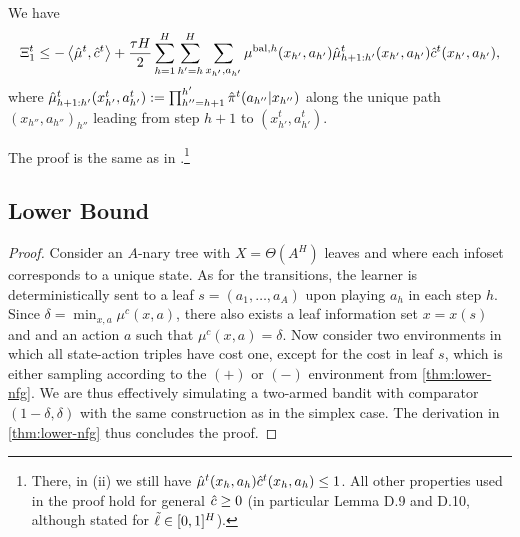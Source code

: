 \begin{lemma}\label{lem:log-to-linear}
    We have
    \begin{align*}
        \Xi^t_1 \leq -\left\langle \hat{\mu}^t, \hat{c}^t \right\rangle + \frac{\tau H}{2} \sum_{h=1}^{H} \sum_{h'=h}^H \sum_{x_{h'},a_{h'}} \mu^{\text{bal},h}(x_{h'},a_{h'}) \hat{\mu}^{t}_{h+1:h'}(x_{h'},a_{h'})\hat{c}^t(x_{h'},a_{h'}),
    \end{align*}
    where $\hat{\mu}^t_{h+1:h'}(x_{h'}^t,a_{h'}^t):=\prod_{h''=h+1}^{h'}\hat{\pi}^t(a_{h''}|x_{h''})$ along the unique path $(x_{h''},a_{h''})_{h''}$ leading from step $h+1$ to $(x_{h'}^t,a_{h'}^t)$.
\end{lemma}

\noindent The proof is the same as in \citet{bai2022near}.\footnote{There, in (ii) we still have $\hat{\mu}^t(x_h,a_h) \hat{c}^t(x_h,a_h) \leq 1$. All other properties used in the proof hold for general $\hat{c} \geq 0$ (in particular Lemma D.9 and D.10, although stated for $\tilde{\ell} \in [0,1]^H$).} 

\subsection{Lower Bound} \label{app:efg-lower}


\thmEfgLower*

\begin{proof}
    Consider an $A$-nary tree with $X=\Theta(A^H)$ leaves and where each infoset corresponds to a unique state. As for the transitions, the learner is deterministically sent to a leaf $s=(a_1,\dots,a_A)$ upon playing $a_h$ in each step $h$. Since $\delta=\min_{x,a}\mu^c(x,a)$, there also exists a leaf information set $x=x(s)$ and and an action $a$ such that $\mu^c(x,a)=\delta$. Now consider two environments in which all state-action triples have cost one, except for the cost in leaf $s$, which is either sampling according to the $(+)$ or $(-)$ environment from \cref{thm:lower-nfg}. We are thus effectively simulating a two-armed bandit with comparator $(1-\delta,\delta)$ with the same construction as in the simplex case. The derivation in \cref{thm:lower-nfg} thus concludes the proof. 
\end{proof}
